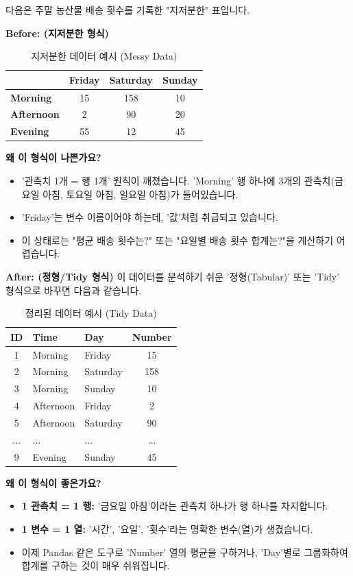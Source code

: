 \documentclass[11pt,a4paper]{book}
\theoremstyle{definition}
\begin{document}
\begin{examplebox}[title={지저분한(Messy) 데이터 변환하기}]
다음은 주말 농산물 배송 횟수를 기록한 "지저분한" 표입니다.

\textbf{Before: (지저분한 형식)}
\begin{table}[h!]
\centering
\caption{지저분한 데이터 예시 (Messy Data)}
\label{tab:messy}
\begin{tabular}{@{}lccc@{}}
\toprule
 & \textbf{Friday} & \textbf{Saturday} & \textbf{Sunday} \\
\midrule
\textbf{Morning} & 15 & 158 & 10 \\
\textbf{Afternoon} & 2 & 90 & 20 \\
\textbf{Evening} & 55 & 12 & 45 \\
\bottomrule
\end{tabular}
\end{table}

\textbf{왜 이 형식이 나쁜가요?}
\begin{itemize}
    \item '관측치 1개 = 행 1개' 원칙이 깨졌습니다. 'Morning' 행 하나에 3개의 관측치(금요일 아침, 토요일 아침, 일요일 아침)가 들어있습니다.
    \item 'Friday'는 변수 이름이어야 하는데, '값'처럼 취급되고 있습니다.
    \item 이 상태로는 "평균 배송 횟수는?" 또는 "요일별 배송 횟수 합계는?"을 계산하기 어렵습니다.
\end{itemize}

\textbf{After: (정형/Tidy 형식)}
이 데이터를 분석하기 쉬운 '정형(Tabular)' 또는 'Tidy' 형식으로 바꾸면 다음과 같습니다.

\begin{table}[h!]
\centering
\caption{정리된 데이터 예시 (Tidy Data)}
\label{tab:tidy}
\begin{tabular}{@{}cllc@{}}
\toprule
\textbf{ID} & \textbf{Time} & \textbf{Day} & \textbf{Number} \\
\midrule
1 & Morning & Friday & 15 \\
2 & Morning & Saturday & 158 \\
3 & Morning & Sunday & 10 \\
4 & Afternoon & Friday & 2 \\
5 & Afternoon & Saturday & 90 \\
... & ... & ... & ... \\
9 & Evening & Sunday & 45 \\
\bottomrule
\end{tabular}
\end{table}

\textbf{왜 이 형식이 좋은가요?}
\begin{itemize}
    \item \textbf{1 관측치 = 1 행:} '금요일 아침'이라는 관측치 하나가 행 하나를 차지합니다.
    \item \textbf{1 변수 = 1 열:} '시간', '요일', '횟수'라는 명확한 변수(열)가 생겼습니다.
    \item 이제 Pandas 같은 도구로 'Number' 열의 평균을 구하거나, 'Day'별로 그룹화하여 합계를 구하는 것이 매우 쉬워집니다.
\end{itemize}
\end{examplebox}
\end{document}
